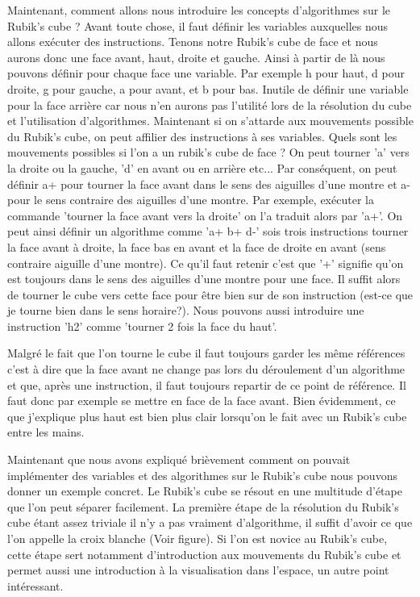 Maintenant, comment allons nous introduire les concepts d'algorithmes sur le Rubik's cube ? Avant toute chose, il faut définir les variables auxquelles nous allons exécuter des instructions. Tenons notre Rubik's cube de face et nous aurons donc une face avant, haut, droite et gauche. Ainsi à partir de là nous pouvons définir pour chaque face une variable. Par exemple h pour haut, d pour droite, g pour gauche, a pour avant, et b pour bas. Inutile de définir une variable pour la face arrière car nous n'en aurons pas l'utilité lors de la résolution du cube et l'utilisation d'algorithmes. Maintenant si on s'attarde aux mouvements possible du Rubik's cube, on peut affilier des instructions à ses variables. Quels sont les mouvements possibles si l'on a un rubik's cube de face ? On peut tourner 'a' vers la droite ou la gauche, 'd' en avant ou en arrière etc... Par conséquent, on peut définir a+ pour tourner la face avant dans le sens des aiguilles d'une montre et a- pour le sens contraire des aiguilles d'une montre. Par exemple, exécuter la commande 'tourner la face avant vers la droite' on l'a traduit alors par 'a+'. On peut ainsi définir un algorithme comme 'a+ b+ d-' sois trois instructions tourner la face avant à droite, la face bas en avant et la face de droite en avant (sens contraire aiguille d'une montre). Ce qu'il faut retenir c'est que '+' signifie qu'on est toujours dans le sens des aiguilles d'une montre pour une face. Il suffit alors de tourner le cube vers cette face pour être bien sur de son instruction (est-ce que je tourne bien dans le sens horaire?). Nous pouvons aussi introduire une instruction 'h2' comme 'tourner 2 fois la face du haut'.

Malgré le fait que l'on tourne le cube il faut toujours garder les même références c'est à dire que la face avant ne change pas lors du déroulement d'un algorithme et que, après une instruction, il faut toujours repartir de ce point de référence. Il faut donc par exemple se mettre en face de la face avant. Bien évidemment, ce que j'explique plus haut est bien plus clair lorsqu'on le fait avec un Rubik's cube entre les mains.

\newpage

Maintenant que nous avons expliqué brièvement comment on pouvait implémenter des variables et des algorithmes sur le Rubik's cube nous pouvons donner un exemple concret. Le Rubik's cube se résout en une multitude d'étape que l'on peut séparer facilement. La première étape de la résolution du Rubik's cube étant assez triviale il n'y a pas vraiment d'algorithme, il suffit d'avoir ce que l'on appelle la croix blanche (Voir figure). Si l'on est novice au Rubik's cube, cette étape sert notamment d'introduction aux mouvements du Rubik's cube et permet aussi une introduction à la visualisation dans l'espace, un autre point intéressant.

